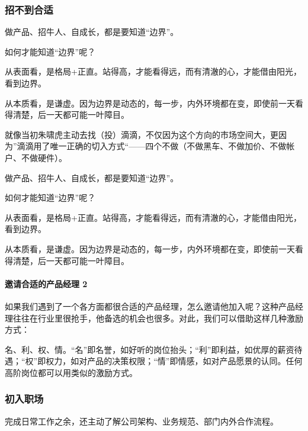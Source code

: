 \documentclass[letterpaper,11pt,english]{sphinxmanual}
\begin{document}
\subsubsection{招不到合适}
\label{\detokenize{chapter_interview/hire:id1}}\label{\detokenize{chapter_interview/hire::doc}}
做产品、招牛人、自成长，都是要知道“边界”。

如何才能知道“边界”呢？

从表面看，是格局+正直。站得高，才能看得远，而有清澈的心，才能借由阳光，看到边界。

从本质看，是谦虚。因为边界是动态的，每一步，内外环境都在变，即使前一天看得清楚，后一天都可能一叶障目。

就像当初朱啸虎主动去找（投）滴滴，不仅因为这个方向的市场空间大，更因为”滴滴用了唯一正确的切入方式“——四个不做（不做黑车、不做加价、不做帐户、不做硬件）。

做产品、招牛人、自成长，都是要知道“边界”。

如何才能知道“边界”呢？

从表面看，是格局+正直。站得高，才能看得远，而有清澈的心，才能借由阳光，看到边界。

从本质看，是谦虚。因为边界是动态的，每一步，内外环境都在变，即使前一天看得清楚，后一天都可能一叶障目。


\paragraph{邀请合适的产品经理 2\sphinxfootnotemark[814]}
\label{\detokenize{chapter_interview/hire:id2}}%
\begin{footnotetext}[814]\sphinxAtStartFootnote
{}
%
\end{footnotetext}\ignorespaces 
如果我们遇到了一个各方面都很合适的产品经理，怎么邀请他加入呢？这种产品经理往往在行业里很抢手，他备选的机会也很多。对此，我们可以借助这样几种激励方式：

名、利、权、情。“名”即名誉，如好听的岗位抬头；“利”即利益，如优厚的薪资待遇；“权”即权力，如对产品的决策权限；“情”即情感，如对产品愿景的认同。任何高阶岗位都可以用类似的激励方式。


\subsubsection{初入职场}
\label{\detokenize{chapter_interview/enter:id1}}\label{\detokenize{chapter_interview/enter::doc}}
完成日常工作之余，还主动了解公司架构、业务规范、部门内外合作流程。%
\begin{footnote}[815]\sphinxAtStartFootnote
{}
%
\end{footnote}
\end{document}
